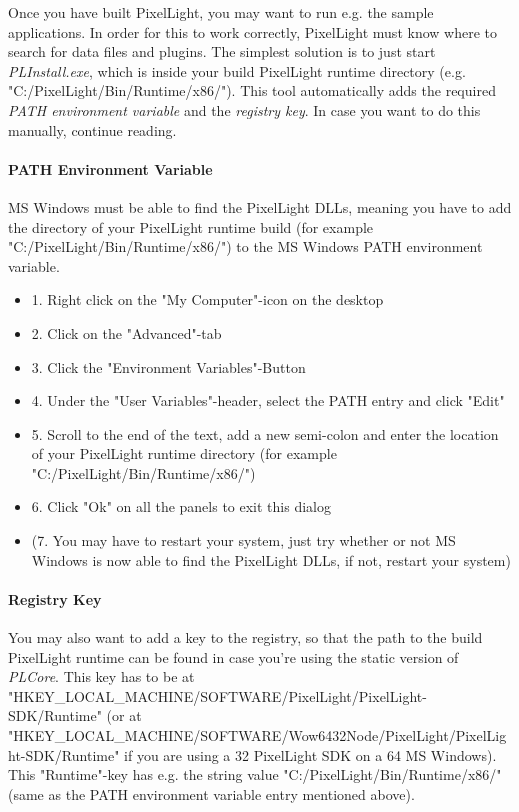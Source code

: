 Once you have built PixelLight, you may want to run e.g. the sample applications. In order for this to work correctly, PixelLight must know where to search for data files and plugins. The simplest solution is to just start \emph{PLInstall.exe}, which is inside your build PixelLight runtime directory (e.g. "C:/PixelLight/Bin/Runtime/x86/"). This tool automatically adds the required \emph{PATH environment variable} and the \emph{registry key}. In case you want to do this manually, continue reading.


\paragraph{PATH Environment Variable}
\ac{MS} Windows must be able to find the PixelLight \ac{DLL}s, meaning you have to add the directory of your PixelLight runtime build (for example "C:/PixelLight/Bin/Runtime/x86/") to the \ac{MS} Windows PATH environment variable.
\begin{itemize}
\item{1. Right click on the "My Computer"-icon on the desktop}
\item{2. Click on the "Advanced"-tab}
\item{3. Click the "Environment Variables"-Button}
\item{4. Under the "User Variables"-header, select the PATH entry and click "Edit"}
\item{5. Scroll to the end of the text, add a new semi-colon and enter the location of your PixelLight runtime directory (for example "C:/PixelLight/Bin/Runtime/x86/")}
\item{6. Click "Ok" on all the panels to exit this dialog}
\item{(7. You may have to restart your system, just try whether or not \ac{MS} Windows is now able to find the PixelLight \ac{DLL}s, if not, restart your system)}
\end{itemize}


\paragraph{Registry Key}
You may also want to add a key to the registry, so that the path to the build PixelLight runtime can be found in case you're using the static version of \emph{PLCore}. This key has to be at "HKEY\_LOCAL\_MACHINE/SOFTWARE/PixelLight/PixelLight-SDK/Runtime" (or at "HKEY\_LOCAL\_MACHINE/SOFTWARE/Wow6432Node/PixelLight/PixelLight-SDK/Runtime" if you are using a \SI{32}{\bit} PixelLight SDK on a \SI{64}{\bit} \ac{MS} Windows). This "Runtime"-key has e.g. the string value "C:/PixelLight/Bin/Runtime/x86/" (same as the PATH environment variable entry mentioned above).




